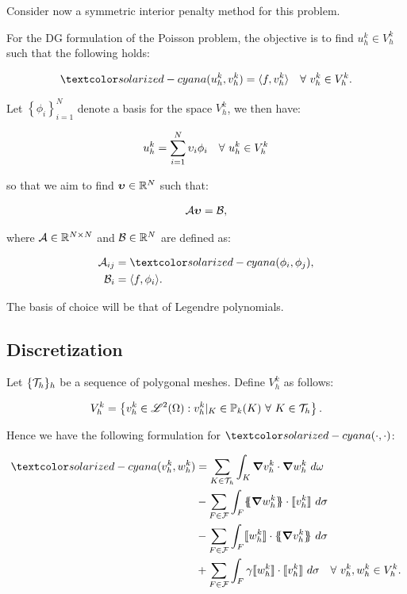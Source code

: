 Consider now a symmetric interior penalty method for this problem.

For the DG formulation of the Poisson problem, the objective is to find $u^k_h \in V^k_h$ such that the following holds:

\begin{gather}
    \boa{u^k_h}{v^k_h} = \langle f, v^k_h \rangle \quad \Forall v^k_h \in V^k_h.
\end{gather}

Let $\left\{ \phi_i \right\}_{i = 1}^N$ denote a basis for the space $V^k_h$, we then have:

\begin{gather}
    u^k_h = \sum_{i = 1}^N \upsilon_i \phi_i \quad \forall ~ u^k_h \in V^k_h
\end{gather}

so that we aim to find $\bm{\upsilon} \in \mathbb{R}^N$ such that:

\begin{gather}
    \mathcal{A} \bm{\upsilon} = \mathcal{B},
\end{gather}

where $\mathcal{A} \in \mathbb{R}^{N \times N}$ and $\mathcal{B} \in \mathbb{R}^N$ are defined as:

\begin{align}
    \MA_{ij} &= \boa{\phi_i}{\phi_j}, \label{matrix} \\ 
    \VB_i &= \langle f, \phi_i \rangle. \label{forcing}
\end{align}

The basis of choice will be that of Legendre polynomials.

\subsection{Discretization}

Let $\{\mathcal{T}_h\}_h$ be a sequence of polygonal meshes. Define $V^k_h$ as follows:

\begin{gather}
    V^k_h = \left\{ v^k_h \in \mathscr{L}^2(\Omega): v^k_h \vert_K \in \mathbb{P}_{k}(K) ~ \forall ~ K \in \mathcal{T}_h \right\}.
\end{gather}

Hence we have the following formulation for $\boa{\cdot}{\cdot}$:

\begin{align} 
    \begin{split} \label{boa}
        \boa{v^k_h}{w^k_h} &= \sum_{K \in \Tau_h} \int_K \grad v^k_h \cdot \grad w^k_h ~ d \omega \\
        &- \sum_{F \in \F} \int_F \{\!\!\{ \grad w^k_h \}\!\!\} \cdot \llbracket v^k_h \rrbracket ~ d \sigma  \\
        &- \sum_{F \in \F} \int_F \llbracket w^k_h \rrbracket \cdot \{\!\!\{ \grad v^k_h \}\!\!\} ~ d \sigma \\
        &+ \sum_{F \in \F} \int_F \gamma \llbracket w^k_h \rrbracket \cdot \llbracket v^k_h \rrbracket ~ d \sigma \quad \Forall v^k_h, w^k_h \in V^k_h.
    \end{split}
\end{align}

